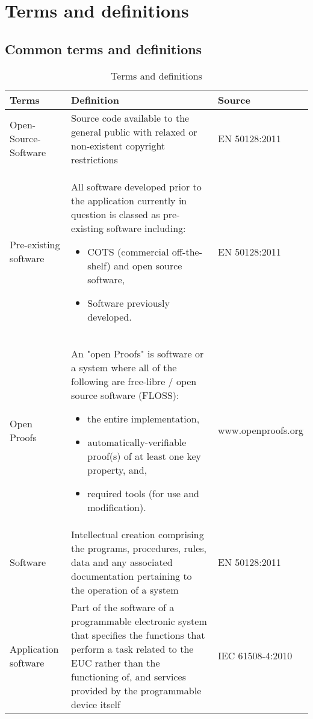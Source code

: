\documentclass{template/openetcs_report}
\begin{document}
\mainmatter

\chapter{Terms and definitions}
\section{Common terms and definitions}
\begin{table} [h]
\begin{tabular}{|p{4cm}|p{7cm}|p{3cm}|}
\hline
\bfseries Terms & \bfseries Definition & \bfseries Source \\ 
\hline 
\hline
Open-Source-Software & Source code available to the general public with relaxed or non-existent copyright restrictions & EN 50128:2011 \\ 
\hline
Pre-existing software & All software developed prior to the application currently in question is classed as pre-existing software including: 
\begin{itemize}
\item COTS (commercial off-the-shelf) and open source software,
\item Software previously developed.
\end{itemize} & EN 50128:2011 \\ 
\hline
Open Proofs & An "open Proofs" is software or a system where all of the following are free-libre / open source software (FLOSS): 
\begin{itemize}
\item the entire implementation,
\item automatically-verifiable proof(s) of at least one key property, and,
\item required tools (for use and modification).
\end{itemize} & www.openproofs.org \\ 
\hline
Software & Intellectual creation comprising the programs, procedures, rules, data and any associated documentation pertaining to the operation of a system & EN 50128:2011 \\ 
\hline
Application software & Part of the software of a programmable electronic system that specifies the functions that perform a task related to the EUC rather than the functioning of, and services provided by the programmable device itself & IEC 61508-4:2010 \\ 
\hline
\end{tabular}
\\
\caption{Terms and definitions}
\end{table}
\end{document}
